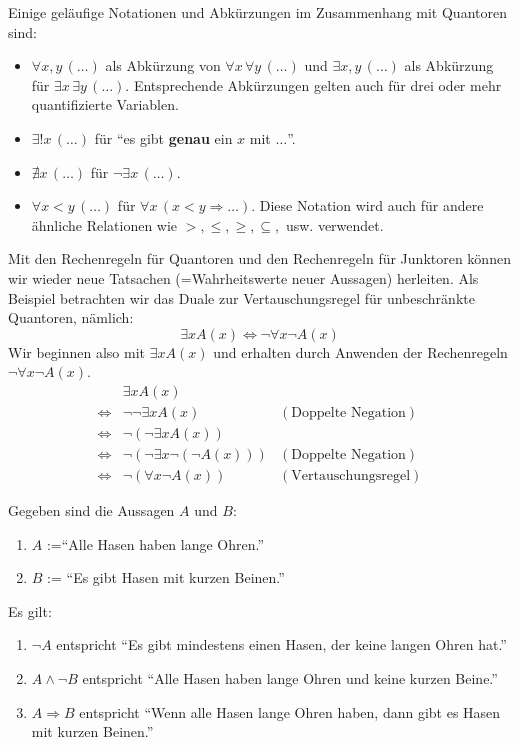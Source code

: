 \begin{example}
    Einige geläufige Notationen und Abkürzungen im Zusammenhang mit Quantoren sind:
    \begin{itemize}
        \item $\forall x,y\,(\dots)$ als Abkürzung von $\forall x\,\forall y\, (\dots)$ und $\exists x,y\,(\dots)$ als Abkürzung für $\exists x\,\exists y\,(\dots)$. Entsprechende Abkürzungen gelten auch für drei oder mehr quantifizierte Variablen.
        \item $\exists ! x\,(\dots)$ für ``es gibt \textbf{genau} ein $x$ mit $\dots$''.
        \item $\nexists x\,(\dots)$ für $\neg\exists x\,(\dots)$.
        \item $\forall x<y\,(\dots)$ für $\forall x\,(x<y\Rightarrow \dots)$. Diese Notation wird auch für andere ähnliche Relationen wie $ >,\leq, \geq, \subseteq, $ usw. verwendet.
    \end{itemize}
\end{example}

\begin{example}
    Mit den Rechenregeln für Quantoren und den Rechenregeln für Junktoren können wir wieder neue Tatsachen (=Wahrheitswerte neuer Aussagen) herleiten. Als Beispiel betrachten wir das Duale zur Vertauschungsregel für unbeschränkte Quantoren, nämlich:
    $$
        \exists xA(x)\Leftrightarrow \neg \forall x\neg A(x)
    $$
    Wir beginnen also mit $\exists xA(x)$ und erhalten durch Anwenden der Rechenregeln $\neg \forall x\neg A(x)$.
    \begin{align*}
        &\exists xA(x)\\
        \Leftrightarrow&\neg\neg\exists xA(x)&(\text{Doppelte Negation}) \\
        \Leftrightarrow&\neg(\neg\exists x A(x))\\
        \Leftrightarrow&\neg(\neg\exists x \neg(\neg A(x)))&(\text{Doppelte Negation})\\
        \Leftrightarrow&\neg(\forall x\neg A(x))&(\text{Vertauschungsregel})
    \end{align*}
\end{example}

\begin{example}
    Gegeben sind die Aussagen $A$ und $B$:
    \begin{enumerate}
        \item[] $A$ :=``Alle Hasen haben lange Ohren.''
        \item[] $B$ := ``Es gibt Hasen mit kurzen Beinen.''
    \end{enumerate}
    \tcblower
    Es gilt:
    \begin{enumerate}
        \item $\neg A$ entspricht ``Es gibt mindestens einen Hasen, der keine langen Ohren hat.''
        \item $A\wedge \neg B$ entspricht ``Alle Hasen haben lange Ohren und keine kurzen Beine.''
        \item $A\Rightarrow B$ entspricht ``Wenn alle Hasen lange Ohren haben, dann gibt es Hasen mit kurzen Beinen.''
    \end{enumerate}
\end{example}

